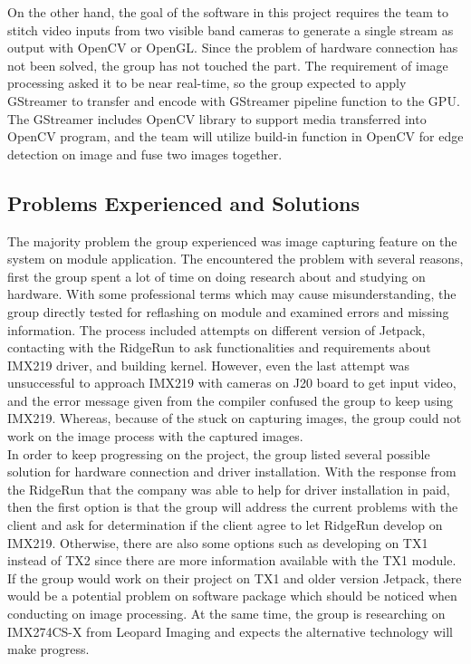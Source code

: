 \documentclass[letterpaper,10pt,serif,draftclsnofoot,onecolumn,compsoc,titlepage]{IEEEtran}
\begin{document}
On the other hand, the goal of the software in this project requires the team to stitch video inputs from 
two visible band cameras to generate a single stream as output with OpenCV or OpenGL. Since the problem of 
hardware connection has not been solved, the group has not touched the part. The requirement of image processing 
asked it to be near real-time, so the group expected to apply GStreamer to transfer and encode with GStreamer 
pipeline function to the GPU. The GStreamer includes OpenCV library to support media transferred into OpenCV 
program, and the team will utilize build-in function in OpenCV for edge detection on image and fuse two images 
together.\\

\subsection{Problems Experienced and Solutions}

The majority problem the group experienced was image capturing feature on the system on module application. 
The encountered the problem with several reasons, first the group spent a lot of time on doing research about 
and studying on hardware. With some professional terms which may cause misunderstanding, the group directly tested 
for reflashing on module and examined errors and missing information. The process included attempts on different 
version of Jetpack, contacting with the RidgeRun to ask functionalities and requirements about IMX219 driver, and
 building kernel. However, even the last attempt was unsuccessful to approach IMX219 with cameras on J20 board to 
 get input video, and the error message given from the compiler confused the group to keep using IMX219. Whereas, 
 because of the stuck on capturing images, the group could not work on the image process with the captured images.\\

 In order to keep progressing on the project, the group listed several possible solution for hardware connection 
 and driver installation. With the response from the RidgeRun that the company was able to help for driver 
 installation in paid, then the first option is that the group will address the current problems with the 
 client and ask for determination if the client agree to let RidgeRun develop on IMX219. Otherwise, there 
 are also some options such as developing on TX1 instead of TX2 since there are more information available 
 with the TX1 module. If the group would work on their project on TX1 and older version Jetpack, there would be 
 a potential problem on software package which should be noticed when conducting on image processing. At the 
 same time, the group is researching on IMX274CS-X from Leopard Imaging and expects the alternative technology 
 will make progress. \\
\end{document}
